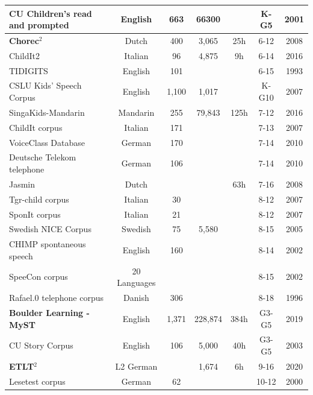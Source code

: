 \begin{table}
\begin{tabular}{l|c|c|c|c|c|c}
CU Children's read and prompted \cite{hagen2003children}& English & 663 & 66300 &  & K-G5 & 2001 \\ 
\hline
\textbf{Chorec$^2$} \cite{chorec} & Dutch & 400 & 3,065 & 25h & 6-12 & 2008 \\ 
\hline
ChildIt2 \cite{childit2} & Italian & 96 &  4,875 & 9h & 6-14 & 2016 \\ 
\hline
TIDIGITS \cite{leonard1993tidigits} & English & 101 &  &  & 6-15 & 1993 \\ 
\hline
CSLU Kids' Speech Corpus \cite{cslu} & English & 1,100 & 1,017 &  & K-G10 & 2007 \\ 
\hline
SingaKids-Mandarin \cite{singakids} & Mandarin & 255 & 79,843 & 125h & 7-12 & 2016 \\ 
\hline
ChildIt corpus \cite{gerosa2006acoustic} & Italian & 171 &  &  & 7-13 & 2007 \\ 
\hline
VoiceClass Database \cite{burkhardt2010database} & German & 170 &  &  & 7-14 & 2010 \\ 
\hline
Deutsche Telekom telephone \cite{burkhardt2010database} & German & 106 &  &  & 7-14 & 2010 \\ 
\hline
Jasmin \cite{JASMIN} & Dutch &  &  & 63h & 7-16 & 2008 \\ 
\hline
Tgr-child corpus \cite{gerosa2006acoustic} & Italian & 30 &  &  & 8-12 & 2007 \\ 
\hline
SponIt corpus \cite{gerosa2006acoustic} & Italian & 21 &  &  & 8-12 & 2007 \\ 
\hline
Swedish NICE Corpus \cite{bell2005swedish} & Swedish & 75 & 5,580 &  & 8-15 & 2005 \\
\hline
CHIMP spontaneous speech \cite{language_children2} & English & 160 &  &  & 8-14 & 2002 \\ 
\hline
SpeeCon corpus  \cite{SPEECONS} & 20 Languages &  &  &  & 8-15 & 2002 \\ 
\hline
Rafael.0 telephone corpus \cite{linguistic-children} & Danish & 306 &  &  & 8-18 & 1996 \\ 
\hline
\textbf{Boulder Learning - MyST} \cite{MyST} & English & 1,371 & 228,874 & 384h & G3-G5 & 2019 \\ 
\hline
CU Story Corpus \cite{hagen2003children} & English & 106 & 5,000 & 40h & G3-G5 & 2003 \\ 
\hline
\textbf{ETLT$^2$} \cite{etlt} & L2 German &  & 1,674 & 6h & 9-16 & 2020 \\ 
\hline
Lesetest corpus \cite{grissemann2000zurcher} & German & 62 &  &  & 10-12 & 2000 \\ 

\end{tabular}
\end{table}
